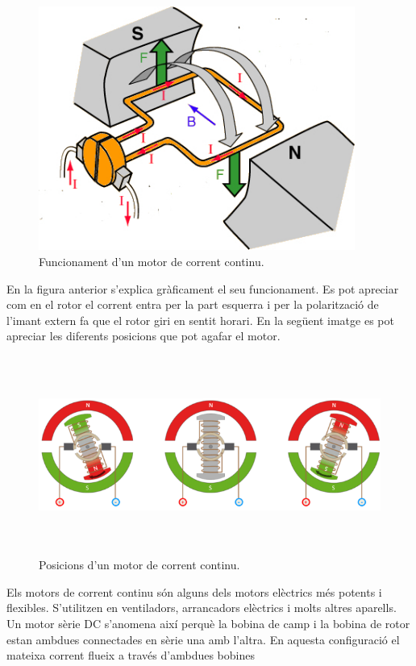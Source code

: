 \begin{figure}[H]
		\centering
    	\includegraphics[width=\textwidth, height=8cm]{Motors/funcmotorcontinua.jpg}
     	\caption{Funcionament d'un motor de corrent continu.} 
\end{figure}

En la figura anterior s'explica gràficament el seu funcionament. Es pot apreciar com en el rotor el corrent entra per la part esquerra i per la polarització de l'imant extern fa que el rotor giri en sentit horari. En la següent imatge es pot apreciar les diferents posicions que pot agafar el motor.

\begin{figure}[H]
		\centering
    	\includegraphics[width=\textwidth, height=6.5cm]{Motors/motorcontinua.png}
     	\caption{Posicions d'un motor de corrent continu.} 
\end{figure}

Els motors de corrent continu són alguns dels motors elèctrics més potents i flexibles. S'utilitzen en ventiladors, arrancadors elèctrics i molts altres aparells. Un motor sèrie DC s'anomena així perquè la bobina de camp i la bobina de rotor estan ambdues connectades en sèrie una amb l'altra. En aquesta configuració el mateixa corrent flueix a través d'ambdues bobines

